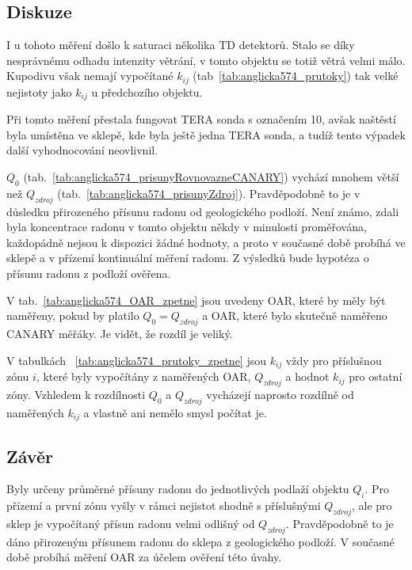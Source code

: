 \subsection{Diskuze}
I u tohoto měření došlo k saturaci několika TD detektorů. Stalo se díky nesprávnému odhadu intenzity větrání, v tomto objektu se totiž větrá velmi málo. Kupodivu však nemají vypočítané $k_{ij}$ (tab~\ref{tab:anglicka574_prutoky}) tak velké nejistoty jako $k_{ij}$ u předchozího objektu. 

Při tomto měření přestala fungovat TERA sonda s označením 10, avšak naštěstí byla umístěna ve sklepě, kde byla ještě jedna TERA sonda, a tudíž tento výpadek další vyhodnocování neovlivnil. 

$Q_0$ (tab.~\ref{tab:anglicka574_prisunyRovnovazneCANARY}) vychází mnohem větší než $Q_{zdroj}$ (tab.~\ref{tab:anglicka574_prisunyZdroj}). Pravděpodobně to je v důsledku přirozeného přísunu radonu od geologického podloží. Není známo, zdali byla koncentrace radonu v tomto objektu někdy v minulosti proměřována, každopádně nejsou k dispozici žádné hodnoty, a proto v současné době probíhá ve sklepě a v přízemí kontinuální měření radonu. Z výsledků bude hypotéza o přísunu radonu z podloží ověřena.

V tab.~\ref{tab:anglicka574_OAR_zpetne} jsou uvedeny OAR, které by měly být naměřeny, pokud by platilo $Q_0=Q_{zdroj}$ a OAR, které bylo skutečně naměřeno CANARY měřáky. Je vidět, že rozdíl je veliký.

V tabulkách ~\ref{tab:anglicka574_prutoky_zpetne} jsou $k_{ij}$ vždy pro příslušnou zónu $i$, které byly vypočítány z naměřených OAR, $Q_{zdroj}$ a hodnot $k_{ij}$ pro ostatní zóny. Vzhledem k rozdílnosti $Q_0$ a $Q_{zdroj}$ vycházejí naprosto rozdílně od naměřených $k_{ij}$ a vlastně ani nemělo smysl počítat je. 

\subsection{Závěr}
Byly určeny průměrné přísuny radonu do jednotlivých podlaží objektu $Q_i$. Pro přízemí a první zónu vyšly v rámci nejistot shodně s příslušnými $Q_{zdroj}$, ale pro sklep je vypočítaný přísun radonu velmi odlišný od $Q_{zdroj}$. Pravděpodobně to je dáno přirozeným přísunem radonu do sklepa z geologického podloží. V současné době probíhá měření OAR za účelem ověření této úvahy.

